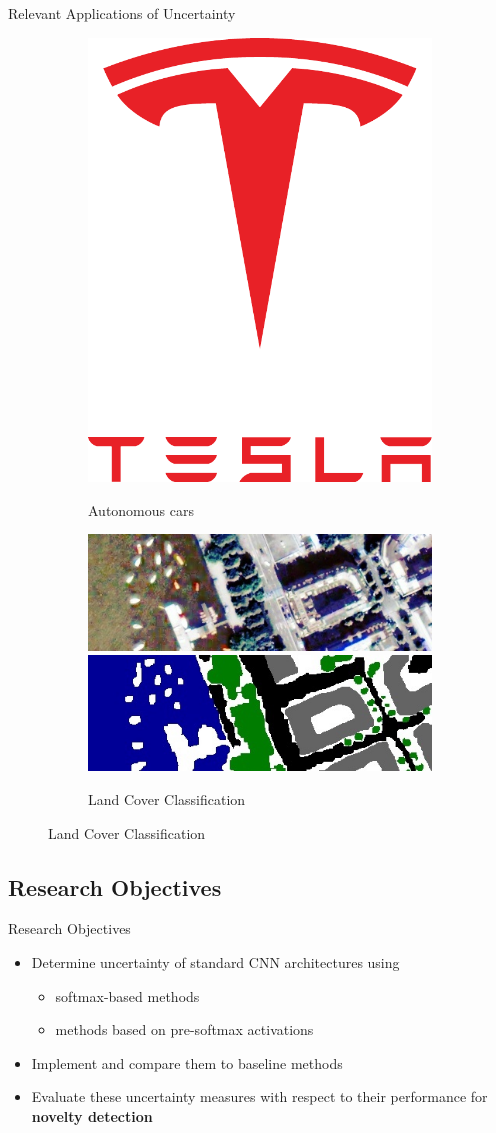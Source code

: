 \documentclass[xcolor={usenames,dvipsnames}]{beamer}
\begin{document}
\begin{frame}{Relevant Applications of Uncertainty}
\begin{figure}[H]
\begin{subfigure}{0.24\textwidth}
			\includegraphics[width=.2\textwidth]{Tesla_Motors}\\
			\caption{Autonomous cars}
		\end{subfigure}
		\pause
		\begin{subfigure}{0.4\textwidth}
			\centering
			\includegraphics[width=\textwidth]{Im_11_detail.jpg}
			\includegraphics[width=\textwidth]{GT_11_detail.jpg}
			\caption{Land Cover Classification}
		\end{subfigure}
	\end{figure}
\end{frame}

\subsection{Research Objectives}
\begin{frame}{Research Objectives}
\begin{itemize}
	\item Determine uncertainty of standard \gls{CNN} architectures using
	\begin{itemize}
		\item softmax-based methods
		\item methods based on pre-softmax activations
	\end{itemize}
	\item Implement  and compare them to baseline methods
	\item Evaluate these uncertainty measures with respect to their performance for \textbf{{\color{greenWUR} novelty detection}}
\end{itemize}
\end{frame}
\end{document}
